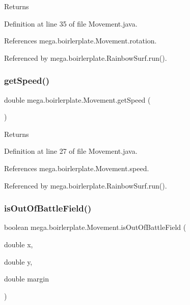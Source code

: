 \begin{DoxyReturn}{Returns}

\end{DoxyReturn}


Definition at line 35 of file Movement.\+java.



References mega.\+boirlerplate.\+Movement.\+rotation.



Referenced by mega.\+boirlerplate.\+Rainbow\+Surf.\+run().

\mbox{\label{classmega_1_1boirlerplate_1_1_movement_a17278ea51b6cd25cb60f1a755fa2fdfe}} 
\subsubsection{\texorpdfstring{get\+Speed()}{getSpeed()}}
{\footnotesize\ttfamily double mega.\+boirlerplate.\+Movement.\+get\+Speed (\begin{DoxyParamCaption}{ }\end{DoxyParamCaption})}

\begin{DoxyReturn}{Returns}

\end{DoxyReturn}


Definition at line 27 of file Movement.\+java.



References mega.\+boirlerplate.\+Movement.\+speed.



Referenced by mega.\+boirlerplate.\+Rainbow\+Surf.\+run().

\mbox{\label{classmega_1_1boirlerplate_1_1_movement_a2b5fbe62b5f09644750da41784622351}} 
\subsubsection{\texorpdfstring{is\+Out\+Of\+Battle\+Field()}{isOutOfBattleField()}}
{\footnotesize\ttfamily boolean mega.\+boirlerplate.\+Movement.\+is\+Out\+Of\+Battle\+Field (\begin{DoxyParamCaption}\item[{double}]{x,  }\item[{double}]{y,  }\item[{double}]{margin }\end{DoxyParamCaption})}



